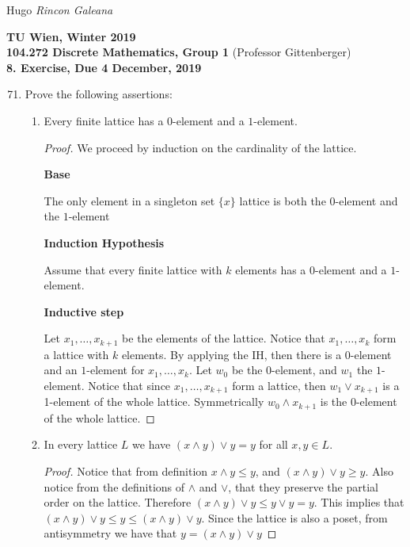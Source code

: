 \documentclass[12pt]{article}
\newcommand{\Term}{Winter 2019}
\newcommand{\Course}{104.272 Discrete Mathematics, Group 1}
\newcommand{\Assignment}{8. Exercise}
\newcommand{\DueDate}{ 4 December, 2019 }
\begin{document}
Hugo \textit{Rincon Galeana}
\begin{center}

\textbf{TU Wien, \Term} \\
\textbf{\Course} (Professor Gittenberger) \\
\textbf{\Assignment, Due \DueDate}
\end{center}


\begin{enumerate}
    \setcounter{enumi}{70}
    
    \item Prove the following assertions:
        \begin{enumerate}
            \item Every finite lattice has a $0$-element and a $1$-element.
            
            \begin{proof}
            We proceed by induction on the cardinality of the lattice.
            
            \textbf{Base}
            
            The only element in a singleton set $\{x\}$ lattice is both the $0$-element and the $1$-element
            
            \textbf{Induction Hypothesis }
            
            Assume that every finite lattice with $k$ elements has a $0$-element and a $1$-element.
            
            \textbf{Inductive step}
            
            Let $x_1, \ldots, x_{k+1}$ be the elements of the lattice. Notice that $x_1, \ldots, x_k$ form a lattice with $k$ elements. By applying the IH, then there is a $0$-element and an $1$-element for $x_1, \ldots, x_k$. Let $w_0$ be the $0$-element, and $w_1$ the $1$-element. Notice that since $x_1, \ldots, x_{k+1}$ form a lattice, then $w_1 \vee x_{k+1}$ is a 1-element of the whole lattice. Symmetrically $w_0 \wedge x_{k+1}$ is the $0$-element of the whole lattice. 
            
            \end{proof}
            
            \item In every lattice $L$ we have $(x \wedge y) \vee y = y$ for all $x,y \in L$.
            \begin{proof}
                 Notice that from definition $x \wedge y \leq y$, and $(x \wedge y) \vee y \geq y$. Also notice from the definitions of $\wedge $ and $\vee$, that they preserve the partial order on the lattice. Therefore $(x \wedge y) \vee y \leq y \vee y = y$. This implies that $(x \wedge y) \vee y \leq y \leq (x \wedge y)\vee y$. Since the lattice is also a poset, from antisymmetry we have that $y = (x \wedge y)\vee y $
            \end{proof}
            

\end{enumerate}
\end{enumerate}
\end{document}

